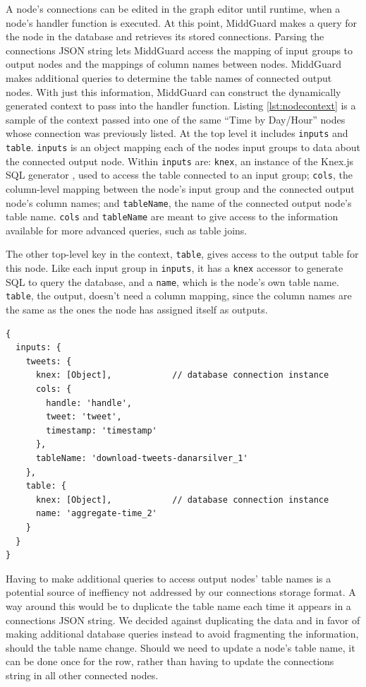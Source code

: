 \documentclass[midd]{thesis}
\begin{document}
A node's connections can be edited in the graph editor until runtime, when a
node's handler function is executed. At this point, MiddGuard makes a query for
the node in the database and retrieves its stored connections. Parsing the
connections JSON string lets MiddGuard access the mapping of input groups to
output nodes and the mappings of column names between nodes. MiddGuard makes
additional queries to determine the table names of connected output nodes. With
just this information, MiddGuard can construct the dynamically generated context
to pass into the handler function. Listing \ref{lst:nodecontext} is a sample of
the context passed into one of the same ``Time by Day/Hour'' nodes whose
connection was previously listed. At the top level it includes \texttt{inputs}
and \texttt{table}. \texttt{inputs} is an object mapping each of the nodes input
groups to data about the connected output node. Within \texttt{inputs} are:
\texttt{knex}, an instance of the Knex.js SQL generator \cite{knexjs}, used to
access the table connected to an input group; \texttt{cols}, the column-level
mapping between the node's input group and the connected output node's column
names; and \texttt{tableName}, the name of the connected output node's table
name. \texttt{cols} and \texttt{tableName} are meant to give access to the
information available for more advanced queries, such as table joins.

The other top-level key in the context, \texttt{table}, gives access to the
output table for this node. Like each input group in \texttt{inputs}, it has a
\texttt{knex} accessor to generate SQL to query the database, and a
\texttt{name}, which is the node's own table name. \texttt{table}, the output,
doesn't need a column mapping, since the column names are the same as the ones
the node has assigned itself as outputs.

\begin{lstlisting}[caption={The context passed into a ``Time by Day/Hour'' node's handler function.}, captionpos=b, label={lst:nodecontext}]
{
  inputs: {
    tweets: {
      knex: [Object],            // database connection instance
      cols: {
        handle: 'handle',
        tweet: 'tweet',
        timestamp: 'timestamp'
      },
      tableName: 'download-tweets-danarsilver_1'
    },
    table: {
      knex: [Object],            // database connection instance
      name: 'aggregate-time_2'
    }
  }
}
\end{lstlisting}

Having to make additional queries to access output nodes' table names is a
potential source of ineffiency not addressed by our connections storage format.
A way around this would be to duplicate the table name each time it appears in a
connections JSON string. We decided against duplicating the data and in favor of
making additional database queries instead to avoid fragmenting the information,
should the table name change. Should we need to update a node's table name, it
can be done once for the row, rather than having to update the connections
string in all other connected nodes.
\end{document}
